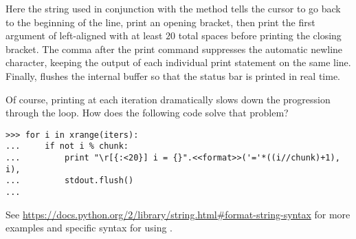 Here the string  used in conjunction with the  method tells the cursor to go back to the beginning of the line, print an opening bracket, then print the first argument of  left-aligned with at least $20$ total spaces before printing the closing bracket.
The comma after the print command suppresses the automatic newline character, keeping the output of each individual print statement on the same line.
Finally,  flushes the internal buffer so that the status bar is printed in real time.

Of course, printing at each iteration dramatically slows down the progression through the loop.
How does the following code solve that problem?

\begin{lstlisting}
>>> for i in xrange(iters):
...     if not i % chunk:
...         print "\r[{:<20}] i = {}".<<format>>('='*((i//chunk)+1), i),
...         stdout.flush()
...
\end{lstlisting}

See \url{https://docs.python.org/2/library/string.html\#format-string-syntax} for more examples and specific syntax for using .
